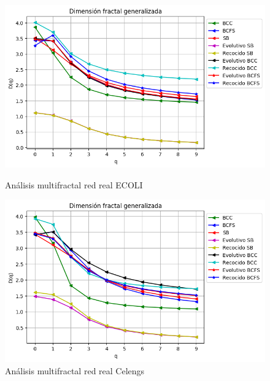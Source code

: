 \begin{figure}[!htb]
    \begin{minipage}{0.48\textwidth}
        \centering
        \includegraphics[scale=0.5]{CapituloAAnexos/imagenesAnexoC/Fractalidad/grafica_Dq20180504_000006EColi.png}
        \caption{Análisis multifractal red real ECOLI}
    \end{minipage}\hfill
   \begin{minipage}{0.48\textwidth}
         \centering
        \includegraphics[scale=0.5]{CapituloAAnexos/imagenesAnexoC/Fractalidad/grafica_Dq20180504_010629Celengs.png}
    \caption{Análisis multifractal red real Celengs}
    \end{minipage}
\end{figure}

